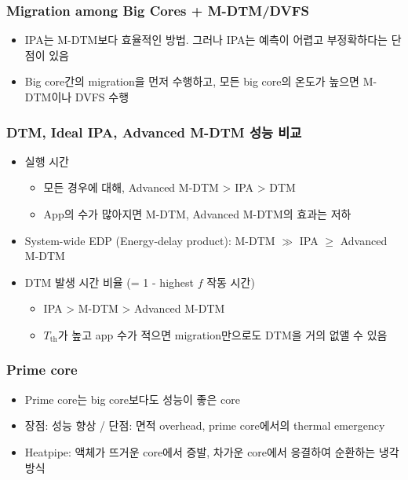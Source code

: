 \subsubsection*{Migration among Big Cores + M-DTM/DVFS}
\begin{itemize}
    \item IPA는 M-DTM보다 효율적인 방법. 그러나 IPA는 예측이 어렵고 부정확하다는 단점이 있음
    \item Big core간의 migration을 먼저 수행하고, 모든 big core의 온도가 높으면 M-DTM이나 DVFS 수행
\end{itemize}

\subsubsection*{DTM, Ideal IPA, Advanced M-DTM 성능 비교}
\begin{itemize}
    \item 실행 시간
    \begin{itemize}
        \item 모든 경우에 대해, Advanced M-DTM \textgreater{} IPA \textgreater{} DTM
        \item App의 수가 많아지면 M-DTM, Advanced M-DTM의 효과는 저하
    \end{itemize}
    \item System-wide EDP (Energy-delay product): M-DTM $\gg$ IPA $\geq$ Advanced M-DTM
    \item DTM 발생 시간 비율 (= 1 - highest $f$ 작동 시간)
    \begin{itemize}
        \item IPA > M-DTM > Advanced M-DTM
        \item $T_\mathrm{th}$가 높고 app 수가 적으면 migration만으로도 DTM을 거의 없앨 수 있음
    \end{itemize}
\end{itemize}

\subsubsection*{Prime core}
\begin{itemize}
    \item Prime core는 big core보다도 성능이 좋은 core
    \item 장점: 성능 향상 / 단점: 면적 overhead, prime core에서의 thermal emergency
    \item Heatpipe: 액체가 뜨거운 core에서 증발, 차가운 core에서 응결하여 순환하는 냉각 방식
\end{itemize}
\begin{figures}
\end{figures}

